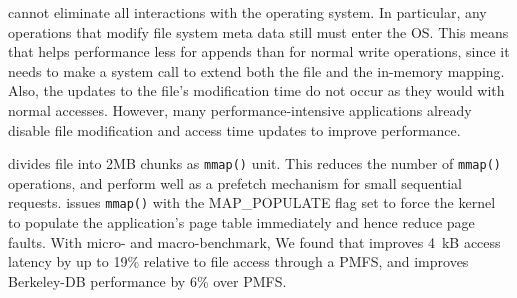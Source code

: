 \DAChell{} cannot eliminate all interactions with the operating system.  In
particular, any operations that modify file system meta data still must enter
the OS.  This means that \DAChell{} helps performance less for appends than for
normal write operations, since it needs to make a system call to extend both
the file and the in-memory mapping.  
Also, the updates to the file's modification time do not occur as they
would with normal accesses.  However, many performance-intensive applications
already disable file modification and access time updates to improve
performance.

\DAChell{} divides file into 2MB chunks as \texttt{mmap()} unit. This
reduces the number of \texttt{mmap()} operations, and perform well as 
a prefetch mechanism for small sequential requests.  
\DAChell{} issues \texttt{mmap()} with the MAP\_POPULATE flag set to force the
kernel to
populate the application's page table immediately and hence reduce page faults.
With micro- and macro-benchmark, We found that \DAChell{} improves 4~kB access
latency by up to 19\% relative to file access through a PMFS, and improves
Berkeley-DB performance by 6\% over PMFS.


